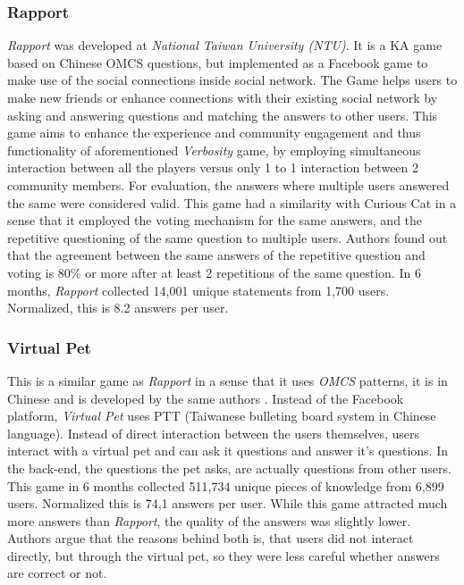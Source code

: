\subsubsection{Rapport}
\label{section:r:rapport} 
\emph{Rapport} was developed at \emph{National Taiwan University (NTU)}. It
is a KA game based on Chinese OMCS questions, but implemented as a 
Facebook game to make use of the social connections inside social network. 
The Game helps users to make new friends or enhance connections with their 
existing social network by asking and answering questions and matching the 
answers to other users\parencite{Kuo2009}. This game aims to enhance the 
experience and community engagement and thus functionality of aforementioned 
\emph{Verbosity} game, by employing simultaneous  interaction between all the 
players versus only 1 to 1 interaction between 2 community members. For 
evaluation, the answers where multiple users answered the same were considered 
valid. This game had a similarity with Curious Cat in a sense that it employed
the voting mechanism for the same answers, and the repetitive questioning of
the same question to multiple users. Authors found out that the agreement 
between the same answers of the repetitive question and voting is 80\% or more 
after at least 2 repetitions of the same question. In 6 months, \emph{Rapport}
collected 14,001 unique statements from 1,700 users. Normalized, this is
8.2 answers per user.

\subsubsection{Virtual Pet}
\label{section:r:virtualpet} 
This is a similar game as \emph{Rapport} in a sense that it
uses \emph{OMCS} patterns, it is in Chinese and is developed by the same authors
\parencite{Kuo2009}. Instead of the Facebook platform, \emph{Virtual Pet} uses
PTT (Taiwanese bulleting board system in Chinese language). Instead of direct
interaction between the users themselves, users interact with a virtual pet and
can ask it questions and answer it's questions. In the back-end, the questions
the pet asks, are actually questions from other users. This game in 6 months 
collected 511,734 unique pieces of knowledge from 6,899 users. Normalized this
is 74,1 answers per user. While this game attracted much more answers than 
\emph{Rapport}, the quality of the answers was slightly lower. Authors
argue that the reasons behind both is, that users did not interact directly,
but through the virtual pet, so they were less careful whether answers are
correct or not.

